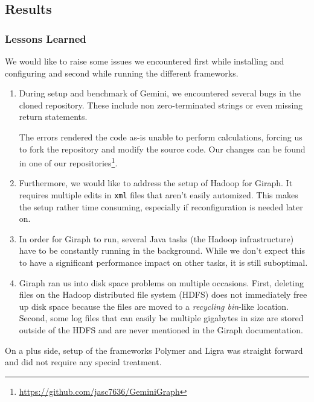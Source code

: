 
\subsection{Results}


\subsubsection{Lessons Learned}


We would like to raise some issues we encountered first while installing and configuring and second while running the different frameworks.

\begin{enumerate}
	\item During setup and benchmark of Gemini, we encountered several bugs in the cloned repository. These include non zero-terminated strings or even missing return statements.

	The errors rendered the code as-is unable to perform calculations, forcing us to fork the repository and modify the source code. Our changes can be found in one of our repositories\footnote{\url{https://github.com/jasc7636/GeminiGraph}}.

	\item Furthermore, we would like to address the setup of Hadoop for Giraph. It requires multiple edits in \texttt{xml} files that aren't easily automized. This makes the setup rather time consuming, especially if reconfiguration is needed later on.
	\item In order for Giraph to run, several Java tasks (the Hadoop infrastructure) have to be constantly running in the background. While we don't expect this to have a significant performance impact on other tasks, it is still suboptimal.
	\item Giraph ran us into disk space problems on multiple occasions. First, deleting files on the Hadoop distributed file system (HDFS) does not immediately free up disk space because the files are moved to a \emph{recycling bin}-like location. Second, some log files that can easily be multiple gigabytes in size are stored outside of the HDFS and are never mentioned in the Giraph documentation.
\end{enumerate}


On a plus side, setup of the frameworks Polymer and Ligra was straight forward and did not require any special treatment.






